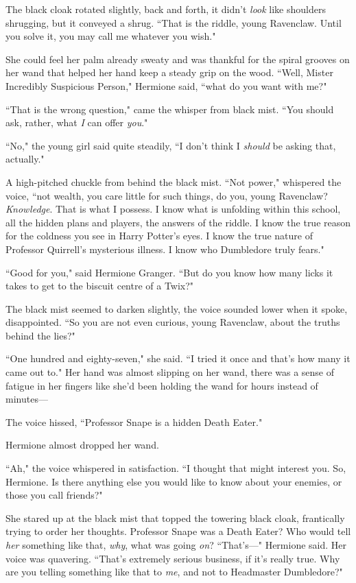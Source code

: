 The black cloak rotated slightly, back and forth, it didn't \emph{look} like shoulders shrugging, but it conveyed a shrug. ``That is the riddle, young Ravenclaw. Until you solve it, you may call me whatever you wish."

She could feel her palm already sweaty and was thankful for the spiral grooves on her wand that helped her hand keep a steady grip on the wood. ``Well, Mister Incredibly Suspicious Person," Hermione said, ``what do you want with me?"

``That is the wrong question," came the whisper from black mist. ``You should ask, rather, what \emph{I} can offer \emph{you}."

``No," the young girl said quite steadily, ``I don't think I \emph{should} be asking that, actually."

A high-pitched chuckle from behind the black mist. ``Not power," whispered the voice, ``not wealth, you care little for such things, do you, young Ravenclaw? \emph{Knowledge}. That is what I possess. I know what is unfolding within this school, all the hidden plans and players, the answers of the riddle. I know the true reason for the coldness you see in Harry Potter's eyes. I know the true nature of Professor Quirrell's mysterious illness. I know who Dumbledore truly fears."

``Good for you," said Hermione Granger. ``But do you know how many licks it takes to get to the biscuit centre of a Twix?"

The black mist seemed to darken slightly, the voice sounded lower when it spoke, disappointed. ``So you are not even curious, young Ravenclaw, about the truths behind the lies?"

``One hundred and eighty-seven," she said. ``I tried it once and that's how many it came out to." Her hand was almost slipping on her wand, there was a sense of fatigue in her fingers like she'd been holding the wand for hours instead of minutes---

The voice hissed, ``Professor Snape is a hidden Death Eater."

Hermione almost dropped her wand.

``Ah," the voice whispered in satisfaction. ``I thought that might interest you. So, Hermione. Is there anything else you would like to know about your enemies, or those you call friends?"

She stared up at the black mist that topped the towering black cloak, frantically trying to order her thoughts. Professor Snape was a Death Eater? Who would tell \emph{her} something like that, \emph{why}, what was going \emph{on}? ``That's---" Hermione said. Her voice was quavering. ``That's extremely serious business, if it's really true. Why are you telling something like that to \emph{me}, and not to Headmaster Dumbledore?"

